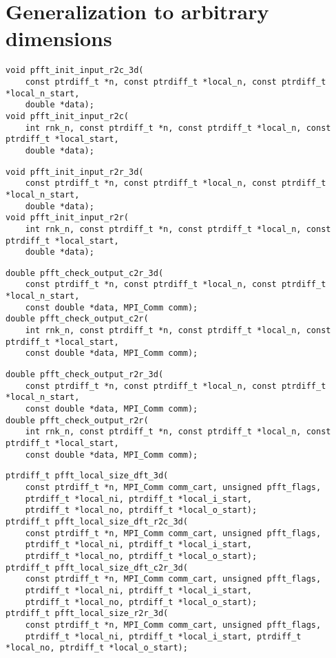 \section{Generalization to arbitrary dimensions}

\begin{lstlisting}
void pfft_init_input_r2c_3d(
    const ptrdiff_t *n, const ptrdiff_t *local_n, const ptrdiff_t *local_n_start,
    double *data);
void pfft_init_input_r2c(
    int rnk_n, const ptrdiff_t *n, const ptrdiff_t *local_n, const ptrdiff_t *local_start,
    double *data);
\end{lstlisting}

\begin{lstlisting}
void pfft_init_input_r2r_3d(
    const ptrdiff_t *n, const ptrdiff_t *local_n, const ptrdiff_t *local_n_start,
    double *data);
void pfft_init_input_r2r(
    int rnk_n, const ptrdiff_t *n, const ptrdiff_t *local_n, const ptrdiff_t *local_start,
    double *data);
\end{lstlisting}


\begin{lstlisting}
double pfft_check_output_c2r_3d(
    const ptrdiff_t *n, const ptrdiff_t *local_n, const ptrdiff_t *local_n_start,
    const double *data, MPI_Comm comm);
double pfft_check_output_c2r(
    int rnk_n, const ptrdiff_t *n, const ptrdiff_t *local_n, const ptrdiff_t *local_start,
    const double *data, MPI_Comm comm);
\end{lstlisting}

\begin{lstlisting}
double pfft_check_output_r2r_3d(
    const ptrdiff_t *n, const ptrdiff_t *local_n, const ptrdiff_t *local_n_start,
    const double *data, MPI_Comm comm);
double pfft_check_output_r2r(
    int rnk_n, const ptrdiff_t *n, const ptrdiff_t *local_n, const ptrdiff_t *local_start,
    const double *data, MPI_Comm comm);
\end{lstlisting}

\begin{lstlisting}
ptrdiff_t pfft_local_size_dft_3d(
    const ptrdiff_t *n, MPI_Comm comm_cart, unsigned pfft_flags,
    ptrdiff_t *local_ni, ptrdiff_t *local_i_start,
    ptrdiff_t *local_no, ptrdiff_t *local_o_start);
ptrdiff_t pfft_local_size_dft_r2c_3d(
    const ptrdiff_t *n, MPI_Comm comm_cart, unsigned pfft_flags,
    ptrdiff_t *local_ni, ptrdiff_t *local_i_start,
    ptrdiff_t *local_no, ptrdiff_t *local_o_start);
ptrdiff_t pfft_local_size_dft_c2r_3d(
    const ptrdiff_t *n, MPI_Comm comm_cart, unsigned pfft_flags,
    ptrdiff_t *local_ni, ptrdiff_t *local_i_start,
    ptrdiff_t *local_no, ptrdiff_t *local_o_start);
ptrdiff_t pfft_local_size_r2r_3d(
    const ptrdiff_t *n, MPI_Comm comm_cart, unsigned pfft_flags,
    ptrdiff_t *local_ni, ptrdiff_t *local_i_start, ptrdiff_t *local_no, ptrdiff_t *local_o_start);
\end{lstlisting}

